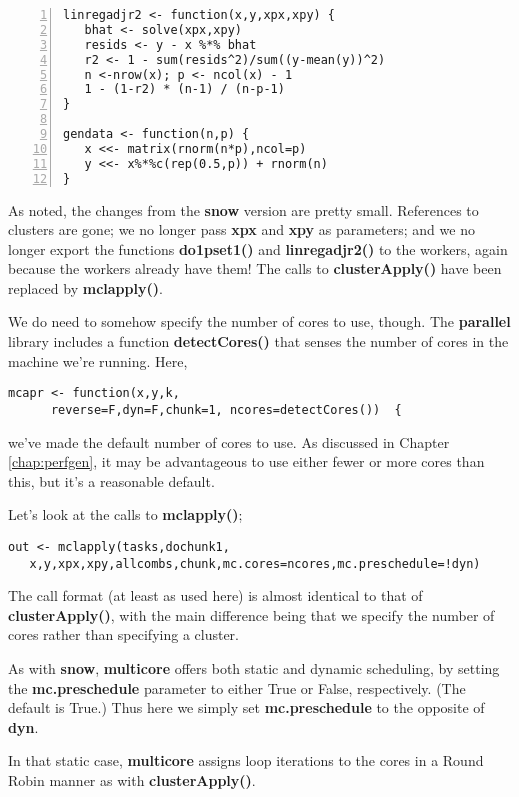 \begin{lstlisting}[numbers=left]
linregadjr2 <- function(x,y,xpx,xpy) {
   bhat <- solve(xpx,xpy)
   resids <- y - x %*% bhat
   r2 <- 1 - sum(resids^2)/sum((y-mean(y))^2)
   n <-nrow(x); p <- ncol(x) - 1
   1 - (1-r2) * (n-1) / (n-p-1)
}

gendata <- function(n,p) {
   x <<- matrix(rnorm(n*p),ncol=p)
   y <<- x%*%c(rep(0.5,p)) + rnorm(n)
}

\end{lstlisting}

As noted, the changes from the {\bf snow} version are pretty small.
References to clusters are gone; we no longer pass {\bf xpx} and {\bf
xpy} as parameters; and we no longer export the functions {\bf
do1pset1()} and {\bf linregadjr2()} to the workers, again because the
workers already have them!  The calls to {\bf clusterApply()} have been
replaced by {\bf mclapply()}.

We do need to somehow specify the number of cores to use, though.  The
{\bf parallel} library includes a function {\bf detectCores()} that
senses the number of cores in the machine we're running.  Here,

\begin{lstlisting}
mcapr <- function(x,y,k,
      reverse=F,dyn=F,chunk=1, ncores=detectCores())  {
\end{lstlisting}

we've made the default number of cores to use.  As discussed in Chapter
\ref{chap:perfgen}, it may be advantageous to use either fewer or more cores
than this, but it's a reasonable default.

Let's look at the calls to {\bf mclapply()};

\begin{lstlisting}
out <- mclapply(tasks,dochunk1,
   x,y,xpx,xpy,allcombs,chunk,mc.cores=ncores,mc.preschedule=!dyn)
\end{lstlisting}

The call format (at least as used here) is almost identical to that of
{\bf clusterApply()}, with the main difference being that we
specify the number of cores rather than specifying a cluster.

As with {\bf snow}, {\bf multicore} offers both static and dynamic
scheduling, by setting the {\bf mc.preschedule} parameter to either True
or False, respectively.  (The default is True.)  Thus here we simply set 
{\bf mc.preschedule} to the opposite of {\bf dyn}.

In that static case, {\bf multicore} assigns loop iterations to the
cores in a Round Robin manner as with {\bf clusterApply()}.

